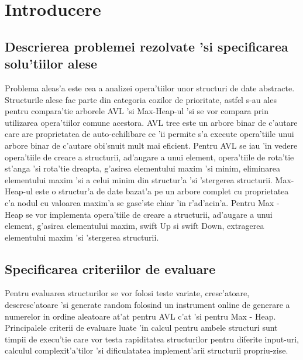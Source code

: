 \chapter{Introducere}
\section{Descrierea problemei rezolvate 'si specificarea solu'tiilor alese}
Problema aleas'a este cea a analizei opera'tiilor unor structuri de date abstracte. Structurile alese fac parte din categoria cozilor de prioritate, astfel s-au ales pentru compara'tie arborele AVL 'si Max-Heap-ul 'si se vor compara prin utilizarea opera'tiilor comune acestora.
\newline 
\myindent
AVL tree este un arbore binar de c'autare care are proprietatea de auto-echilibare ce 'ii permite s'a execute opera'tiile unui arbore binar de c'autare obi'snuit mult mai eficient. Pentru AVL se iau 'in vedere opera'tiile de creare a structurii, ad'augare a unui element, opera'tiile de rota'tie st'anga 'si rota'tie dreapta, g'asirea elementului maxim 'si minim, eliminarea elementului maxim 'si a celui minim din structur'a 'si 'stergerea structurii. Max-Heap-ul este o structur'a de date bazat'a pe un arbore complet cu proprietatea c'a nodul cu valoarea maxim'a se gase'ste chiar 'in r'ad'acin'a. Pentru Max - Heap se vor implementa opera'tiile de creare a structurii, ad'augare a unui element, g'asirea elementului maxim, swift Up si swift Down, extragerea elementului maxim 'si 'stergerea structurii.
\vspace{5 mm}
\section{Specificarea criteriilor de evaluare}
Pentru evaluarea structurilor se vor folosi teste variate, cresc'atoare, descresc'atoare 'si generate random folosind un instrument online de generare a numerelor in ordine aleatoare\cite{Random} at'at pentru AVL c'at 'si pentru Max - Heap. Principalele criterii de evaluare luate 'in calcul pentru ambele structuri sunt timpii de execu'tie care vor testa rapiditatea structurilor pentru diferite input-uri, calculul complexit'a'tilor 'si dificulatatea implement'arii structurii propriu-zise.
